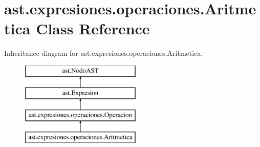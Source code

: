 \hypertarget{classast_1_1expresiones_1_1operaciones_1_1_aritmetica}{}\section{ast.\+expresiones.\+operaciones.\+Aritmetica Class Reference}
\label{classast_1_1expresiones_1_1operaciones_1_1_aritmetica}
Inheritance diagram for ast.\+expresiones.\+operaciones.\+Aritmetica\+:\begin{figure}[H]
\begin{center}
\leavevmode
\includegraphics[height=4.000000cm]{classast_1_1expresiones_1_1operaciones_1_1_aritmetica}
\end{center}
\end{figure}
